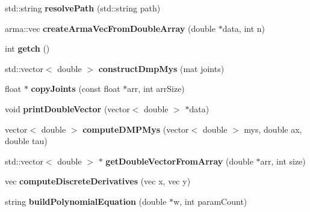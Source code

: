 \begin{DoxyCompactItemize}
\item 
\hypertarget{namespacekukadu_a7b1f2056450bc85b74ecc4538afeb205}{std\-::string {\bfseries resolve\-Path} (std\-::string path)}\label{namespacekukadu_a7b1f2056450bc85b74ecc4538afeb205}

\item 
\hypertarget{namespacekukadu_acfe94f7c9dedf7e326afcede6c0dc470}{arma\-::vec {\bfseries create\-Arma\-Vec\-From\-Double\-Array} (double $\ast$data, int n)}\label{namespacekukadu_acfe94f7c9dedf7e326afcede6c0dc470}

\item 
\hypertarget{namespacekukadu_a9e31ceb82001724baca14add7b29be90}{int {\bfseries getch} ()}\label{namespacekukadu_a9e31ceb82001724baca14add7b29be90}

\item 
\hypertarget{namespacekukadu_accae42b85a473fbf487d9ba2a323df6a}{std\-::vector$<$ double $>$ {\bfseries construct\-Dmp\-Mys} (mat joints)}\label{namespacekukadu_accae42b85a473fbf487d9ba2a323df6a}

\item 
\hypertarget{namespacekukadu_ab997169b5dbe7f4f32cf8b65cb5eff23}{float $\ast$ {\bfseries copy\-Joints} (const float $\ast$arr, int arr\-Size)}\label{namespacekukadu_ab997169b5dbe7f4f32cf8b65cb5eff23}

\item 
\hypertarget{namespacekukadu_aba879f8f78972a2d5f1dce992888564c}{void {\bfseries print\-Double\-Vector} (vector$<$ double $>$ $\ast$data)}\label{namespacekukadu_aba879f8f78972a2d5f1dce992888564c}

\item 
\hypertarget{namespacekukadu_a818b7bfadd10b3b0387bd99c650da1ac}{vector$<$ double $>$ {\bfseries compute\-D\-M\-P\-Mys} (vector$<$ double $>$ mys, double ax, double tau)}\label{namespacekukadu_a818b7bfadd10b3b0387bd99c650da1ac}

\item 
\hypertarget{namespacekukadu_a6a8f99e06ddd1859374dddbb68f468b8}{std\-::vector$<$ double $>$ $\ast$ {\bfseries get\-Double\-Vector\-From\-Array} (double $\ast$arr, int size)}\label{namespacekukadu_a6a8f99e06ddd1859374dddbb68f468b8}

\item 
\hypertarget{namespacekukadu_aa60d33e5c4264f143ed2d61d724e4da0}{vec {\bfseries compute\-Discrete\-Derivatives} (vec x, vec y)}\label{namespacekukadu_aa60d33e5c4264f143ed2d61d724e4da0}

\item 
\hypertarget{namespacekukadu_a8570101c8c4f0eb2512652952afd93c2}{string {\bfseries build\-Polynomial\-Equation} (double $\ast$w, int param\-Count)}\label{namespacekukadu_a8570101c8c4f0eb2512652952afd93c2}


\end{DoxyCompactItemize}
